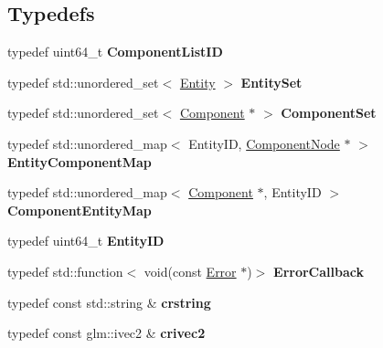 \subsection*{Typedefs}
\begin{DoxyCompactItemize}
\item 
\mbox{\label{namespacenta_a2b7b647fe83786540b5e342a4a0474fa}} 
typedef uint64\+\_\+t {\bfseries Component\+List\+ID}
\item 
\mbox{\label{namespacenta_ab1a4e1926834dedfce30d0f6ed301fbf}} 
typedef std\+::unordered\+\_\+set$<$ \hyperlink{classnta_1_1Entity}{Entity} $>$ {\bfseries Entity\+Set}
\item 
\mbox{\label{namespacenta_a42c93a10ef59c9dbc5d2b24fb2a93b39}} 
typedef std\+::unordered\+\_\+set$<$ \hyperlink{classnta_1_1Component}{Component} $\ast$ $>$ {\bfseries Component\+Set}
\item 
\mbox{\label{namespacenta_a5bbe888781155ddeee0af5822e45fa16}} 
typedef std\+::unordered\+\_\+map$<$ Entity\+ID, \hyperlink{structnta_1_1ComponentNode}{Component\+Node} $\ast$ $>$ {\bfseries Entity\+Component\+Map}
\item 
\mbox{\label{namespacenta_a941d400edfbb84e895e33289b8912f26}} 
typedef std\+::unordered\+\_\+map$<$ \hyperlink{classnta_1_1Component}{Component} $\ast$, Entity\+ID $>$ {\bfseries Component\+Entity\+Map}
\item 
\mbox{\label{namespacenta_aa68b3663f658b73faa34f47acbe800b2}} 
typedef uint64\+\_\+t {\bfseries Entity\+ID}
\item 
\mbox{\label{namespacenta_a1f5715ee41c7a9174d2cc404fdb8556a}} 
typedef std\+::function$<$ void(const \hyperlink{structnta_1_1Error}{Error} $\ast$)$>$ {\bfseries Error\+Callback}
\item 
\mbox{\label{namespacenta_a2491f988e95afee0abb966d6a73bd2f2}} 
typedef const std\+::string \& {\bfseries crstring}
\item 
\mbox{\label{namespacenta_a548da3d0073e8741e8e18696701855b8}} 
typedef const glm\+::ivec2 \& {\bfseries crivec2}

\end{DoxyCompactItemize}
